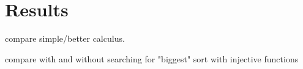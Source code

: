 \section{Results}

compare simple/better calculus.

compare with and without searching for "biggest" sort
with injective functions


